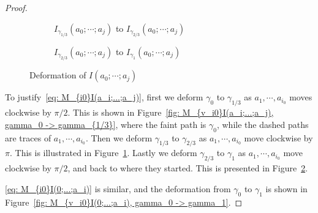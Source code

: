 \begin{proof}
\begin{figure}[H]
\begin{subfigure}[b]{0.48\textwidth}
\caption{$I_{\gamma_{1/3}}(a_0;\cdots;a_j)$ to $I_{\gamma_{2/3}}(a_0;\cdots;a_j)$}
\label{fig: M_{v_i0}I(a_i;...;a_j), gamma_{1/3} -> gamma_{2/3}}
\end{subfigure}
\begin{subfigure}[b]{0.48\textwidth}
\ContinuedFloat
\centering
{}
\caption{$I_{\gamma_{2/3}}(a_0;\cdots;a_j)$ to $I_{\gamma_{1}}(a_0;\cdots;a_j)$}
\label{fig: M_{v_i0}I(a_i;...;a_j), gamma_{2/3} -> gamma_1}
\end{subfigure}
\caption{Deformation of $I(a_0;\cdots;a_j)$}
\label{fig: M_{v_i0}I(a_i;...;a_j)}
\end{figure}

To justify~\eqref{eq: M_{i0}I(a_i;...;a_j)}, first we deform $\gamma_0$ to $\gamma_{1/3}$ as $a_{1},\cdots,a_{i_0}$ moves clockwise by $\pi/2$. This is shown in Figure~\ref{fig: M_{v_i0}I(a_i;...;a_j), gamma_0 -> gamma_{1/3}}, where the faint path is $\gamma_0$, while the dashed paths are traces of $a_1,\cdots,a_{i_0}$. Then we deform $\gamma_{1/3}$ to $\gamma_{2/3}$ as $a_{1},\cdots,a_{i_0}$ move clockwise by $\pi$. This is illustrated in Figure~\ref{fig: M_{v_i0}I(a_i;...;a_j), gamma_{1/3} -> gamma_{2/3}}. Lastly we deform $\gamma_{2/3}$ to $\gamma_{1}$ as $a_{1},\cdots,a_{i_0}$ move clockwise by $\pi/2$, and back to where they started. This is presented in Figure~\ref{fig: M_{v_i0}I(a_i;...;a_j), gamma_{2/3} -> gamma_1}.

\eqref{eq: M_{i0}I(0;...;a_i)} is similar, and the deformation from $\gamma_0$ to $\gamma_1$ is shown in Figure~\ref{fig: M_{v_i0}I(0;...;a_i), gamma_0 -> gamma_1}.


\end{proof}
